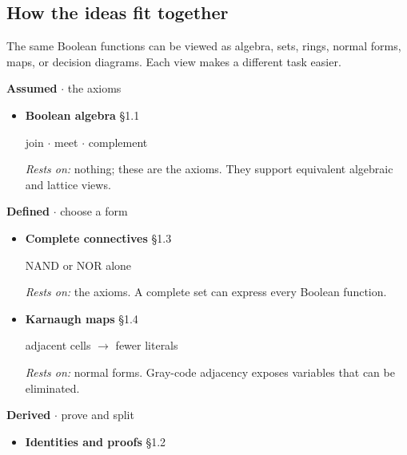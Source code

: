 \documentclass[11pt]{article}
\begin{document}
\begin{keepsection}
\section{How the ideas fit together}

The same Boolean functions can be viewed as algebra, sets, rings, normal forms, maps, or decision diagrams. Each view makes a different task easier.

\textbf{Assumed} \ensuremath{\cdot} the axioms

\begin{itemize}
\item 
{}
\textbf{Boolean algebra} \hfill{\small\color{FAUblue}§1.1}

join \ensuremath{\cdot} meet \ensuremath{\cdot} complement

\emph{Rests on:} nothing; these are the axioms. They support equivalent algebraic and lattice views.

\end{itemize}

\textbf{Defined} \ensuremath{\cdot} choose a form

\begin{itemize}
\item 
{}
\textbf{Complete connectives} \hfill{\small\color{FAUblue}§1.3}

NAND or NOR alone

\emph{Rests on:} the axioms. A complete set can express every Boolean function.

\item 
{}
\textbf{Karnaugh maps} \hfill{\small\color{FAUblue}§1.4}

adjacent cells \ensuremath{\to} fewer literals

\emph{Rests on:} normal forms. Gray-code adjacency exposes variables that can be eliminated.

\end{itemize}

\textbf{Derived} \ensuremath{\cdot} prove and split

\begin{itemize}
\item 
{}
\textbf{Identities and proofs} \hfill{\small\color{FAUblue}§1.2}


\end{itemize}
\end{keepsection}
\end{document}
